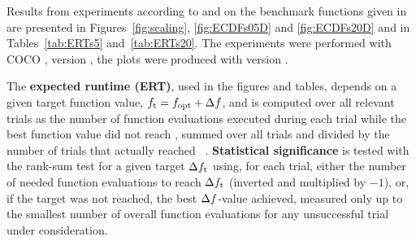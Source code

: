 \documentclass[sigconf]{acmart}
\begin{document}
Results from experiments according to \cite{hansen2016exp} and \cite{hansen2016perfass} on the
benchmark functions given in \cite{wp200901_2010,hansen2010fun} are
presented in Figures~\ref{fig:scaling}, \ref{fig:ECDFs05D} and
\ref{fig:ECDFs20D} and in Tables~\ref{tab:ERTs5} and~\ref{tab:ERTs20}.
The experiments were performed with COCO \cite{hansen2020cocoplat}, version
\change{\version}, the plots were produced with version \change{\version}.

The \textbf{expected runtime (ERT)}, used in the figures and tables,
depends on a given target function value, $f_\mathrm{t}=f_\mathrm{opt}+\Delta f$, and is
computed over all relevant trials as the number of function
evaluations executed during each trial while the best function value
did not reach \ftarget, summed over all trials and divided by the
number of trials that actually reached \ftarget\
\cite{hansen2012exp,price1997dev}.  \textbf{Statistical significance}
is tested with the rank-sum test for a given target $\Delta f_\mathrm{t}$
using, for each trial,
either the number of needed function evaluations to reach
$\Delta f_\mathrm{t}$ (inverted and multiplied by $-1$), or, if the target
was not reached, the best $\Delta f$-value achieved, measured only up to
the smallest number of overall function evaluations for any
unsuccessful trial under consideration.



\end{document}
